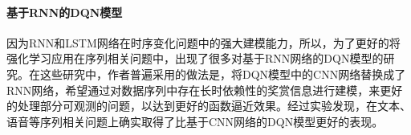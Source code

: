 







\paragraph{基于RNN的DQN模型}
因为RNN和LSTM网络在时序变化问题中的强大建模能力，所以，为了更好的将强化学习应用在序列相关问题中，出现了很多对基于RNN网络的DQN模型的研究\citep{hausknecht2015deep,narasimhan2015language}。在这些研究中，作者普遍采用的做法是，将DQN模型中的CNN网络替换成了RNN网络，希望通过对数据序列中存在长时依赖性的奖赏信息进行建模，来更好的处理部分可观测的问题\citep{bakker2002reinforcement,hausknecht2015deep,lin1993reinforcement,narasimhan2015language}，以达到更好的函数逼近效果。经过实验发现，在文本、语音等序列相关问题上确实取得了比基于CNN网络的DQN模型更好的表现。

